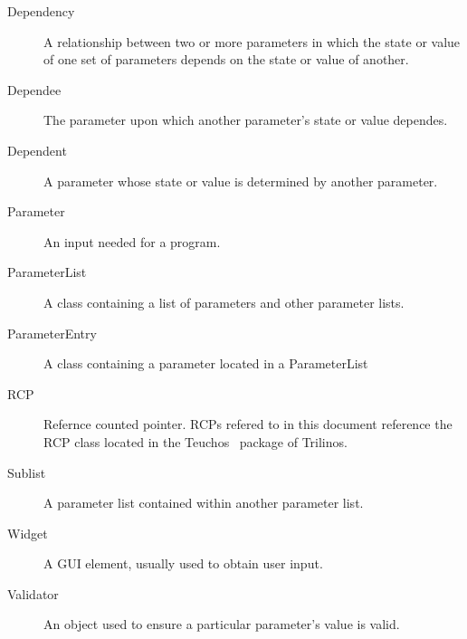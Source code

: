     \begin{description}
	\item[Dependency]
	    A relationship between two or more parameters in which the state
		or value of one set of parameters depends on the state or value of
		another.
	\item[Dependee]
		The parameter upon which another parameter's state or value dependes.
	\item[Dependent]
		A parameter whose state or value is determined by another
		parameter.
	\item[Parameter]
	    An input needed for a program.
	\item[ParameterList]
	    A class containing a list of parameters and other parameter lists.
	\item[ParameterEntry]
		A class containing a parameter located in a ParameterList
	\item[RCP]
	    Refernce counted pointer. RCPs refered to in this document reference the
		RCP class located in the Teuchos~\cite{TeuchosPackage} package of Trilinos.
	\item[Sublist]
	    A parameter list contained within another parameter list.
	\item[Widget]
		A GUI element, usually used to obtain user input.
	\item[Validator]
		An object used to ensure a particular parameter's value is valid.
    \end{description}


